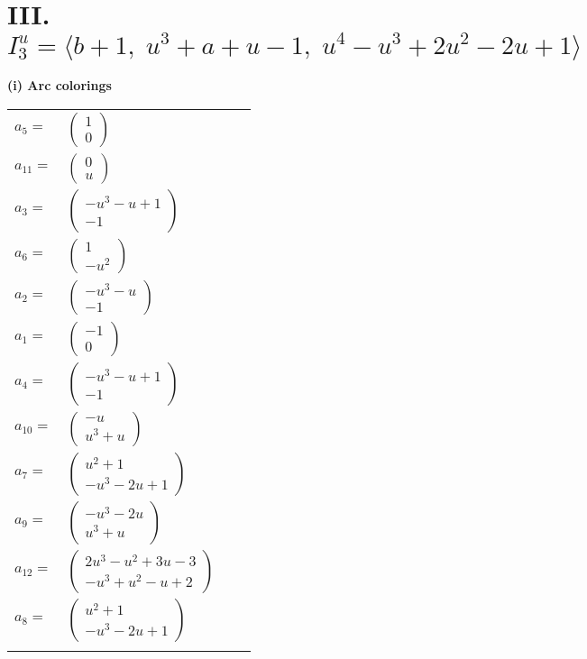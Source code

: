 \documentclass[1p]{elsarticle_modified}
\theoremstyle{definition}
\begin{document}
\centering \section*{III. $I^u_{3}= \langle b+1,\;u^3+a+u-1,\;u^4- u^3+2 u^2-2 u+1 \rangle$}
\flushleft \textbf{(i) Arc colorings}\\
\begin{tabular}{m{7pt} m{180pt} m{7pt} m{180pt} }
\flushright $a_{5}=$&$\begin{pmatrix}1\\0\end{pmatrix}$ \\
\flushright $a_{11}=$&$\begin{pmatrix}0\\u\end{pmatrix}$ \\
\flushright $a_{3}=$&$\begin{pmatrix}- u^3- u+1\\-1\end{pmatrix}$ \\
\flushright $a_{6}=$&$\begin{pmatrix}1\\- u^2\end{pmatrix}$ \\
\flushright $a_{2}=$&$\begin{pmatrix}- u^3- u\\-1\end{pmatrix}$ \\
\flushright $a_{1}=$&$\begin{pmatrix}-1\\0\end{pmatrix}$ \\
\flushright $a_{4}=$&$\begin{pmatrix}- u^3- u+1\\-1\end{pmatrix}$ \\
\flushright $a_{10}=$&$\begin{pmatrix}- u\\u^3+u\end{pmatrix}$ \\
\flushright $a_{7}=$&$\begin{pmatrix}u^2+1\\- u^3-2 u+1\end{pmatrix}$ \\
\flushright $a_{9}=$&$\begin{pmatrix}- u^3-2 u\\u^3+u\end{pmatrix}$ \\
\flushright $a_{12}=$&$\begin{pmatrix}2 u^3- u^2+3 u-3\\- u^3+u^2- u+2\end{pmatrix}$ \\
\flushright $a_{8}=$&$\begin{pmatrix}u^2+1\\- u^3-2 u+1\end{pmatrix}$\\&\end{tabular}
\end{document}
